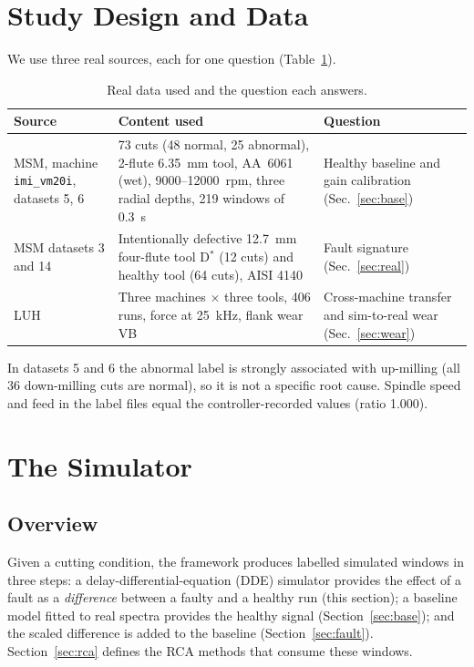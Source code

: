 \documentclass[11pt]{article}
\begin{document}
\section{Study Design and Data}\label{sec:data}
We use three real sources, each for one question (Table~\ref{tab:data}).
\begin{table}[t]\centering\small
\caption{Real data used and the question each answers.}\label{tab:data}
\begin{tabular}{p{3.2cm}p{5.8cm}p{5.2cm}}\toprule
Source & Content used & Question\\\midrule
MSM, machine \texttt{imi\_vm20i}, datasets 5, 6 \citep{kim2026msm} & 73 cuts (48 normal, 25 abnormal), 2-flute 6.35~mm tool, AA~6061 (wet), 9000--12000~rpm, three radial depths, 219 windows of 0.3~s & Healthy baseline and gain calibration (Sec.~\ref{sec:base})\\
MSM datasets 3 and 14 & Intentionally defective 12.7~mm four-flute tool D$^*$ (12 cuts) and healthy tool (64 cuts), AISI 4140 & Fault signature (Sec.~\ref{sec:real})\\
LUH \citep{denkena2023luh} & Three machines $\times$ three tools, 406 runs, force at 25~kHz, flank wear VB & Cross-machine transfer and sim-to-real wear (Sec.~\ref{sec:wear})\\\bottomrule
\end{tabular}
\end{table}
In datasets 5 and 6 the abnormal label is strongly associated with up-milling (all 36 down-milling cuts are normal), so it is not a specific root cause. Spindle speed and feed in the label files equal the controller-recorded values (ratio 1.000).

\section{The Simulator}\label{sec:sim}
\subsection{Overview}
Given a cutting condition, the framework produces labelled simulated windows in three steps: a delay-differential-equation (DDE) simulator provides the effect of a fault as a \emph{difference} between a faulty and a healthy run (this section); a baseline model fitted to real spectra provides the healthy signal (Section~\ref{sec:base}); and the scaled difference is added to the baseline (Section~\ref{sec:fault}). Section~\ref{sec:rca} defines the RCA methods that consume these windows.
\end{document}
